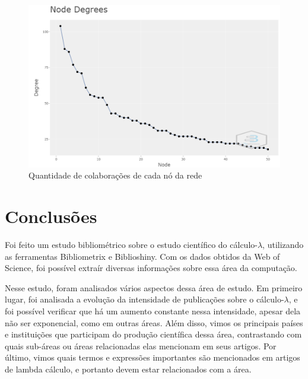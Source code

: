 \begin{figure}
    \centering
    \includegraphics[width=1\textwidth]{experiments/LeoRiether/AnaliseBibliometrica/LambdaCalculus/WoS-20220208/Images/CollaborationNetworkDegrees.png}
    \caption{Quantidade de colaborações de cada nó da rede}
    \label{fig:LC@LeoRiether:CollaborationNetworkDegrees}
\end{figure}

\section{Conclusões}
Foi feito um estudo bibliométrico sobre o estudo científico do cálculo-$\lambda$, utilizando as ferramentas Bibliometrix e Biblioshiny. Com os dados obtidos da Web of Science, foi possível extraír diversas informações sobre essa área da computação.

Nesse estudo, foram analisados vários aspectos dessa área de estudo. Em primeiro lugar, foi analisada a evolução da intensidade de publicações sobre o cálculo-$\lambda$, e foi possível verificar que há um aumento constante nessa intensidade, apesar dela não ser exponencial, como em outras áreas. Além disso, vimos os principais países e instituições que participam do produção científica dessa área, contrastando com quais sub-áreas ou áreas relacionadas elas mencionam em seus artigos. Por último, vimos quais termos e expressões importantes são mencionados em artigos de lambda cálculo, e portanto devem estar relacionados com a área.
